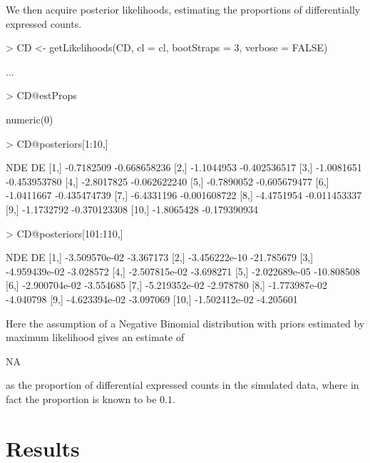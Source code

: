 \documentclass[a4paper]{article}
\begin{document}
We then acquire posterior likelihoods, estimating the proportions of differentially expressed counts.

\begin{Schunk}
\begin{Sinput}
> CD <- getLikelihoods(CD, cl = cl, bootStraps = 3, verbose = FALSE)
\end{Sinput}
\begin{Soutput}
...
\end{Soutput}
\begin{Sinput}
> CD@estProps
\end{Sinput}
\begin{Soutput}
numeric(0)
\end{Soutput}
\begin{Sinput}
> CD@posteriors[1:10,]
\end{Sinput}
\begin{Soutput}
             NDE           DE
 [1,] -0.7182509 -0.668658236
 [2,] -1.1044953 -0.402536517
 [3,] -1.0081651 -0.453953780
 [4,] -2.8017825 -0.062622240
 [5,] -0.7890052 -0.605679477
 [6,] -1.0411667 -0.435474739
 [7,] -6.4331196 -0.001608722
 [8,] -4.4751954 -0.011453337
 [9,] -1.1732792 -0.370123308
[10,] -1.8065428 -0.179390934
\end{Soutput}
\begin{Sinput}
> CD@posteriors[101:110,]
\end{Sinput}
\begin{Soutput}
                NDE         DE
 [1,] -3.509570e-02  -3.367173
 [2,] -3.456222e-10 -21.785679
 [3,] -4.959439e-02  -3.028572
 [4,] -2.507815e-02  -3.698271
 [5,] -2.022689e-05 -10.808508
 [6,] -2.900704e-02  -3.554685
 [7,] -5.219352e-02  -2.978780
 [8,] -1.773987e-02  -4.040798
 [9,] -4.623394e-02  -3.097069
[10,] -1.502412e-02  -4.205601
\end{Soutput}
\end{Schunk}

Here the assumption of a Negative Binomial distribution with priors estimated by maximum likelihood gives an estimate of 
\begin{Schunk}
\begin{Soutput}
[1] NA
\end{Soutput}
\end{Schunk}
as the proportion of differential expressed counts in the simulated data, where in fact the proportion is known to be $0.1$.

\section{Results}
\end{document}
